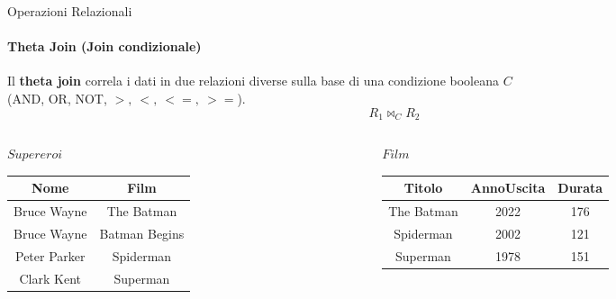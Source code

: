     \begin{frame}{Operazioni Relazionali}
        \framesubtitle{Theta Join (Join condizionale)}
        Il \textbf{theta join} correla i dati in due relazioni diverse sulla base di una condizione booleana $C$\\(AND, OR, NOT, $>,~<,~<=,~>=$).
        \[ R_1 \bowtie_C R_2\]
        \begin{columns}
            \begin{column}{0.48\textwidth}
                \centering
                {\small $Supereroi$}
                \newline
        \begin{tabular}{|c|c|}
            \hline
            \rowcolor{cyan!30}Nome & Film \\
            \hline
            Bruce Wayne & The Batman \\ \hline
            Bruce Wayne & Batman Begins \\ \hline
            Peter Parker & Spiderman \\ \hline
            Clark Kent & Superman\\ \hline
            \end{tabular}
            \end{column}
            \begin{column}{0.48\textwidth}
                \centering
                {\small $Film$}
                \newline
                \begin{tabular}{|c|c|c|}
                    \hline
                    \rowcolor{cyan!30} Titolo & AnnoUscita & Durata \\ \hline
                    The Batman & 2022 & 176 \\ \hline
                    Spiderman & 2002 & 121 \\ \hline
                    Superman & 1978 & 151 \\ \hline
                    \end{tabular}
            \end{column}
        \end{columns}
    \end{frame}
